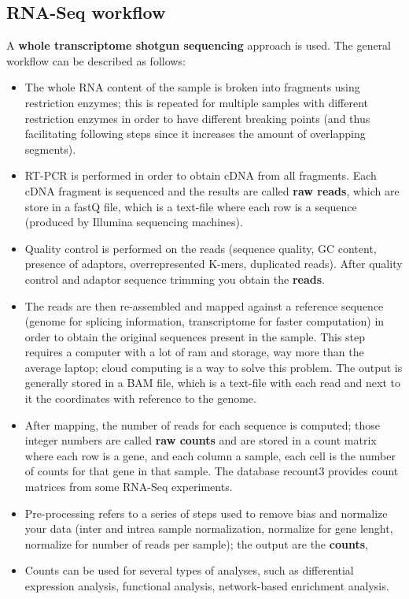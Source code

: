     \subsection{RNA-Seq workflow}
      A \textbf{whole transcriptome shotgun sequencing} approach is used. The general workflow can be described as follows:
      \begin{itemize}
        \item The whole RNA content of the sample is broken into fragments using restriction enzymes; this is repeated for multiple samples with different restriction enzymes in order to have different breaking points (and thus facilitating following steps since it increases the amount of overlapping segments).
        \item RT-PCR is performed in order to obtain cDNA from all fragments. Each cDNA fragment is sequenced and the results are called \textbf{raw reads}, which are store in a fastQ file, which is a text-file where each row is a sequence (produced by Illumina sequencing machines).
        \item Quality control is performed on the reads (sequence quality, GC content, presence of adaptors, overrepresented K-mers, duplicated reads). After quality control and adaptor sequence trimming you obtain the \textbf{reads}.
        \item The reads are then re-assembled and mapped against a reference sequence (genome for splicing information, transcriptome for faster computation) in order to obtain the original sequences present in the sample. This step requires a computer with a lot of ram and storage, way more than the average laptop; cloud computing is a way to solve this problem. The output is generally stored in a BAM file, which is a text-file with each read and next to it the coordinates with reference to the genome.
        \item After mapping, the number of reads for each sequence is computed; those integer numbers are called \textbf{raw counts} and are stored in a count matrix where each row is a gene, and each column a sample, each cell is the number of counts for that gene in that sample. The database recount3 provides count matrices from some RNA-Seq experiments.  
        \item Pre-processing refers to a series of steps used to remove bias and normalize your data (inter and intrea sample normalization, normalize for gene lenght, normalize for number of reads per sample); the output are the \textbf{counts}, 
        \item Counts can be used for several types of analyses, such as differential expression analysis, functional analysis, network-based enrichment analysis.
      \end{itemize}
    
